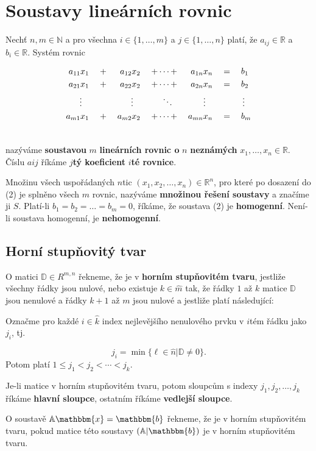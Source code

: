 \documentclass{szzclass}
\begin{document}
\section{Soustavy lineárních rovnic}
\begin{definition}
Nechť $n,m\in\mathbb{N}$ a pro všechna $i\in\{1,\dots, m\}$ a
$j\in\{1, \dots, n\}$ platí, že $a_{ij} \in\mathbb{R}$ a $b_i \in\mathbb{R}$. Systém rovnic

\begin{alignat}{7}
a_{11} x_1 &&\; + \;&& a_{12} x_2 &&\; + \cdots + \;&& a_{1n} x_n &&\; = \;&&& b_1 \\ \notag
a_{21} x_1 &&\; + \;&& a_{22} x_2 &&\; + \cdots + \;&& a_{2n} x_n &&\; = \;&&& b_2 \\ \notag
\vdots\;\;\; &&     && \vdots\;\;\; &&  \ddots\;\;\;&& \vdots\;\;\; &&     &&& \,\vdots \\ \notag
a_{m1} x_1 &&\; + \;&& a_{m2} x_2 &&\; + \cdots + \;&& a_{mn} x_n &&\; = \;&&& b_m \\ \notag
\end{alignat}

nazýváme \textbf{soustavou} $m$ \textbf{lineárních rovnic o} $n$ \textbf{neznámých} $x_1,\dots, x_n \in\mathbb{R}$.\\
Číslu $aij$ říkáme $j$\textbf{tý koeficient} $i$\textbf{té rovnice}.

Množinu všech uspořádaných $n$tic $(x_1, x_2,\dots, x_n) \in\mathbb{R}^n$, pro které po dosazení do (2) je splněno všech $m$ rovnic, nazýváme \textbf{množinou řešení soustavy} a značíme ji $S$.
Platí-li $b_1 = b_2 = \dots = b_m = 0$, říkáme, že soustava (2) je \textbf{homogenní}.
Není-li soustava homogenní, je \textbf{nehomogenní}.
\end{definition}

\subsection{Horní stupňovitý tvar}
\begin{definition}
O matici $\mathbb{D}\in R^{m,n}$ řekneme, že je v \textbf{horním stupňovitém tvaru}, jestliže všechny řádky jsou nulové, nebo existuje $k\in\hat{m}$ tak, že řádky $1$ až $k$ matice $\mathbb{D}$ jsou nenulové a řádky $k + 1$ až $m$ jsou nulové a jestliže platí následující:

Označme pro každé $i\in\hat{k}$ index nejlevějšího nenulového prvku v $i$tém řádku jako
$j_i$, tj.

$$
j_i=\min{\{\ell\in\hat{n}|\mathbb{D}\neq 0\}}.
$$
Potom platí $1 \leq j_1 < j_2 < \cdots < j_k$.

Je-li matice v horním stupňovitém tvaru, potom sloupcům s indexy $j_1, j_2, \dots , j_k$
říkáme \textbf{hlavní sloupce}, ostatním říkáme \textbf{vedlejší sloupce}.

O soustavě $\mathbb{A}\mathbbm{x} = \mathbbm{b}$ řekneme, že je v horním stupňovitém tvaru, pokud matice této soustavy $(\mathbb{A}|\mathbbm{b})$ je v horním stupňovitém tvaru.
\end{definition}
\end{document}
